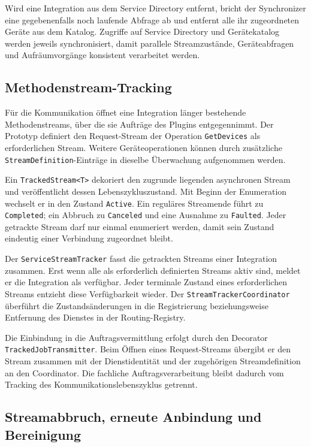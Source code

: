 Wird eine Integration aus dem Service Directory entfernt, bricht der Synchronizer eine gegebenenfalls noch laufende Abfrage ab und entfernt alle ihr zugeordneten Geräte aus dem Katalog. Zugriffe auf Service Directory und Gerätekatalog werden jeweils synchronisiert, damit parallele Streamzustände, Geräteabfragen und Aufräumvorgänge konsistent verarbeitet werden.

\subsection{Methodenstream-Tracking}

Für die Kommunikation öffnet eine Integration länger bestehende Methodenstreams, über die sie Aufträge des Plugins entgegennimmt. Der Prototyp definiert den Request-Stream der Operation \texttt{GetDevices} als erforderlichen Stream. Weitere Geräteoperationen können durch zusätzliche \texttt{StreamDefinition}-Einträge in dieselbe Überwachung aufgenommen werden.

Ein \texttt{TrackedStream<T>} dekoriert den zugrunde liegenden asynchronen Stream und veröffentlicht dessen Lebenszykluszustand. Mit Beginn der Enumeration wechselt er in den Zustand \texttt{Active}. Ein reguläres Streamende führt zu \texttt{Completed}; ein Abbruch zu \texttt{Canceled} und eine Ausnahme zu \texttt{Faulted}. Jeder getrackte Stream darf nur einmal enumeriert werden, damit sein Zustand eindeutig einer Verbindung zugeordnet bleibt.

Der \texttt{ServiceStreamTracker} fasst die getrackten Streams einer Integration zusammen. Erst wenn alle als erforderlich definierten Streams aktiv sind, meldet er die Integration als verfügbar. Jeder terminale Zustand eines erforderlichen Streams entzieht diese Verfügbarkeit wieder. Der \texttt{StreamTrackerCoordinator} überführt die Zustandsänderungen in die Registrierung beziehungsweise Entfernung des Dienstes in der Routing-Registry.

Die Einbindung in die Auftragsvermittlung erfolgt durch den Decorator \texttt{TrackedJob\-Transmitter}. Beim Öffnen eines Request-Streams übergibt er den Stream zusammen mit der Dienstidentität und der zugehörigen Streamdefinition an den Coordinator. Die fachliche Auftragsverarbeitung bleibt dadurch vom Tracking des Kommunikationslebenszyklus getrennt.

\subsection{Streamabbruch, erneute Anbindung und Bereinigung}

